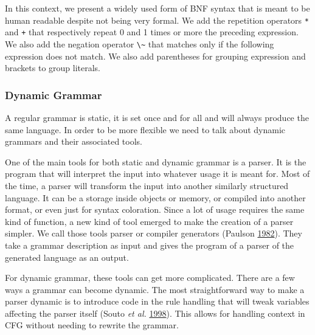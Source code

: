 \documentclass[11pt,a4paper,twoside,openright,titlepage,numbers=noenddot,headinclude,cleardoublepage=empty,openany]{scrreprt}
\theoremstyle{plain}
\theoremstyle{definition}
\theoremstyle{remark}
\newcommand{\passthrough}[1]{#1}
\begin{document}
In this context, we present a widely used form of BNF syntax that is
meant to be human readable despite not being very formal. We add the
repetition operators \passthrough{\lstinline!*!} and
\passthrough{\lstinline!+!} that respectively repeat 0 and 1 times or
more the preceding expression. We also add the negation operator
\passthrough{\lstinline!\~!} that matches only if the following
expression does not match. We also add parentheses for grouping
expression and brackets to group literals.

\hypertarget{dynamic-grammar}{%
\subsubsection{Dynamic Grammar}\label{dynamic-grammar}}

A regular grammar is static, it is set once and for all and will always
produce the same language. In order to be more flexible we need to talk
about dynamic grammars and their associated tools.

One of the main tools for both static and dynamic grammar is a parser.
It is the program that will interpret the input into whatever usage it
is meant for. Most of the time, a parser will transform the input into
another similarly structured language. It can be a storage inside
objects or memory, or compiled into another format, or even just for
syntax coloration. Since a lot of usage requires the same kind of
function, a new kind of tool emerged to make the creation of a parser
simpler. We call those tools parser or compiler generators (Paulson
\protect\hyperlink{ref-paulson_semanticsdirected_1982}{1982}). They take
a grammar description as input and gives the program of a parser of the
generated language as an output.

For dynamic grammar, these tools can get more complicated. There are a
few ways a grammar can become dynamic. The most straightforward way to
make a parser dynamic is to introduce code in the rule handling that
will tweak variables affecting the parser itself (Souto \emph{et al.}
\protect\hyperlink{ref-souto_dynamic_1998}{1998}). This allows for
handling context in CFG without needing to rewrite the grammar.
\end{document}
